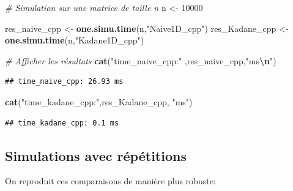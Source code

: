 \documentclass[
]{article}
\newenvironment{Shaded}{\begin{snugshade}}{\end{snugshade}}
\newcommand{\CommentTok}[1]{\textcolor[rgb]{0.56,0.35,0.01}{\textit{#1}}}
\newcommand{\DecValTok}[1]{\textcolor[rgb]{0.00,0.00,0.81}{#1}}
\newcommand{\FunctionTok}[1]{\textcolor[rgb]{0.13,0.29,0.53}{\textbf{#1}}}
\newcommand{\NormalTok}[1]{#1}
\newcommand{\OtherTok}[1]{\textcolor[rgb]{0.56,0.35,0.01}{#1}}
\newcommand{\SpecialCharTok}[1]{\textcolor[rgb]{0.81,0.36,0.00}{\textbf{#1}}}
\newcommand{\StringTok}[1]{\textcolor[rgb]{0.31,0.60,0.02}{#1}}
\begin{document}
\begin{Shaded}
\begin{Highlighting}[]
\CommentTok{\# Simulation sur une matrice de taille n}
\NormalTok{n }\OtherTok{\textless{}{-}} \DecValTok{10000}

\NormalTok{res\_naive\_cpp }\OtherTok{\textless{}{-}} \FunctionTok{one.simu.time}\NormalTok{(n,}\StringTok{"Naive1D\_cpp"}\NormalTok{)}
\NormalTok{res\_Kadane\_cpp }\OtherTok{\textless{}{-}} \FunctionTok{one.simu.time}\NormalTok{(n,}\StringTok{"Kadane1D\_cpp"}\NormalTok{)}

\CommentTok{\# Afficher les résultats}
\FunctionTok{cat}\NormalTok{(}\StringTok{"time\_naive\_cpp:"}\NormalTok{ ,res\_naive\_cpp,}\StringTok{"ms}\SpecialCharTok{\textbackslash{}n}\StringTok{"}\NormalTok{)}
\end{Highlighting}
\end{Shaded}

\begin{verbatim}
## time_naive_cpp: 26.93 ms
\end{verbatim}

\begin{Shaded}
\begin{Highlighting}[]
\FunctionTok{cat}\NormalTok{(}\StringTok{"time\_kadane\_cpp:"}\NormalTok{,res\_Kadane\_cpp, }\StringTok{"ms"}\NormalTok{)}
\end{Highlighting}
\end{Shaded}

\begin{verbatim}
## time_kadane_cpp: 0.1 ms
\end{verbatim}

\subsection{Simulations avec
répétitions}\label{simulations-avec-ruxe9puxe9titions}

On reproduit ces comparaisons de manière plus robuste:
\end{document}
